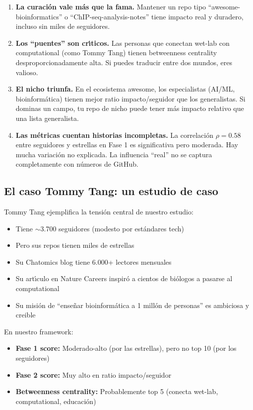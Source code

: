 \documentclass[11pt]{article}
\begin{document}
\begin{enumerate}
    \item \textbf{La curaci\'{o}n vale m\'{a}s que la fama.} Mantener un repo tipo ``awesome-bioinformatics'' o ``ChIP-seq-analysis-notes'' tiene impacto real y duradero, incluso sin miles de seguidores.

    \item \textbf{Los ``puentes'' son cr\'{\i}ticos.} Las personas que conectan wet-lab con computational (como Tommy Tang) tienen betweenness centrality desproporcionadamente alta. Si puedes traducir entre dos mundos, eres valioso.

    \item \textbf{El nicho triunfa.} En el ecosistema awesome, los especialistas (AI/ML, bioinform\'{a}tica) tienen mejor ratio impacto/seguidor que los generalistas. Si dominas un campo, tu repo de nicho puede tener m\'{a}s impacto relativo que una lista generalista.

    \item \textbf{Las m\'{e}tricas cuentan historias incompletas.} La correlaci\'{o}n $\rho = 0.58$ entre seguidores y estrellas en Fase 1 es significativa pero moderada. Hay mucha variaci\'{o}n no explicada. La influencia ``real'' no se captura completamente con n\'{u}meros de GitHub.
\end{enumerate}

\subsection{El caso Tommy Tang: un estudio de caso}

Tommy Tang ejemplifica la tensi\'{o}n central de nuestro estudio:

\begin{itemize}
    \item Tiene $\sim$3.700 seguidores (modesto por est\'{a}ndares tech)
    \item Pero sus repos tienen miles de estrellas
    \item Su Chatomics blog tiene 6.000+ lectores mensuales
    \item Su art\'{\i}culo en Nature Careers inspir\'{o} a cientos de bi\'{o}logos a pasarse al computational
    \item Su misi\'{o}n de ``ense\~{n}ar bioinform\'{a}tica a 1 mill\'{o}n de personas'' es ambiciosa y creible
\end{itemize}

En nuestro framework:
\begin{itemize}
    \item \textbf{Fase 1 score:} Moderado-alto (por las estrellas), pero no top 10 (por los seguidores)
    \item \textbf{Fase 2 score:} Muy alto en ratio impacto/seguidor
    \item \textbf{Betweenness centrality:} Probablemente top 5 (conecta wet-lab, computational, educaci\'{o}n)
\end{itemize}
\end{document}
